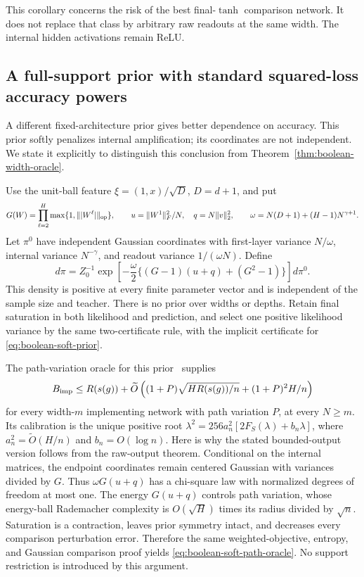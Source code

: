 This corollary concerns the risk of the best final-$\tanh$ comparison network. It does not replace that class by arbitrary raw readouts at the same width. The internal hidden activations remain ReLU.

\subsection{A full-support prior with standard squared-loss accuracy powers}
A different fixed-architecture prior gives better dependence on accuracy. This prior softly penalizes internal amplification; its coordinates are not independent. We state it explicitly to distinguish this conclusion from Theorem~\ref{thm:boolean-width-oracle}.

Use the unit-ball feature $\xi=(1,x)/\sqrt D$, $D=d+1$, and put
\[
 G(W)=\prod_{\ell=2}^H\max\{1,\||W^\ell|\|_{\rm op}\},\qquad
 u=\|W^1\|_F^2/N,\quad q=N\|v\|_2^2,
 \qquad \omega=N(D+1)+(H-1)N^{\gamma+1}.
\]
Let $\pi^0$ have independent Gaussian coordinates with first-layer variance $N/\omega$, internal variance $N^{-\gamma}$, and readout variance $1/(\omega N)$. Define
\begin{equation}
 d\pi=Z_0^{-1}\exp\left[-\frac\omega2
             \{(G-1)(u+q)+(G^2-1)\}\right]d\pi^0.
 \label{eq:boolean-soft-prior}
\end{equation}
This density is positive at every finite parameter vector and is independent of the sample size and teacher. There is no prior over widths or depths. Retain final saturation in both likelihood and prediction, and select one positive likelihood variance by the same two-certificate rule, with the implicit certificate for \eqref{eq:boolean-soft-prior}.

The path-variation oracle for this prior~\cite{softpath} supplies
\begin{equation}
 B_{\rm imp}\le R(s(g))+
 \widetilde O\left((1+P)\sqrt{H R(s(g))/n}+(1+P)^2H/n\right)
 \label{eq:boolean-soft-path-oracle}
\end{equation}
for every width-$m$ implementing network with path variation $P$, at every $N\ge m$. Its calibration is the unique positive root
$\lambda^2=256a_n^2[2F_S(\lambda)+b_n\lambda]$, where
$a_n^2=\widetilde O(H/n)$ and $b_n=O(\log n)$.
Here is why the stated bounded-output version follows from the raw-output theorem. Conditional on the internal matrices, the endpoint coordinates remain centered Gaussian with variances divided by $G$. Thus $\omega G(u+q)$ has a chi-square law with normalized degrees of freedom at most one. The energy $G(u+q)$ controls path variation, whose energy-ball Rademacher complexity is $O(\sqrt H)$ times its radius divided by $\sqrt n$. Saturation is a contraction, leaves prior symmetry intact, and decreases every comparison perturbation error. Therefore the same weighted-objective, entropy, and Gaussian comparison proof yields \eqref{eq:boolean-soft-path-oracle}. No support restriction is introduced by this argument.


